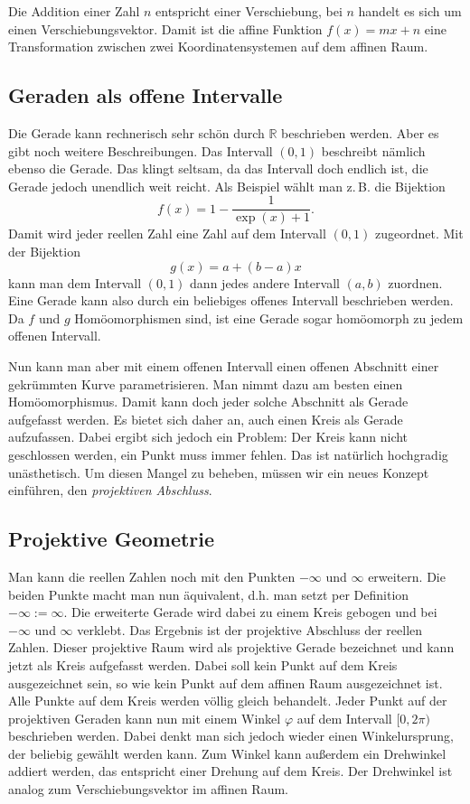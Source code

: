 \documentclass[a4paper,11pt,fleqn,twocolumn,twoside,dvipdfmx]{scrartcl}
\newcommand{\R}{\mathbb R}
\begin{document}
Die Addition einer Zahl $n$ entspricht einer Verschiebung,
bei $n$ handelt es sich um einen Verschiebungsvektor. Damit ist
die affine Funktion $f(x)=mx+n$ eine Transformation zwischen zwei
Koordinatensystemen auf dem affinen Raum.

\subsection{Geraden als offene Intervalle}
Die Gerade kann rechnerisch sehr schön durch $\R$ beschrieben
werden. Aber es gibt noch weitere Beschreibungen. Das Intervall
$(0,1)$ beschreibt nämlich ebenso die Gerade. Das klingt seltsam,
da das Intervall doch endlich ist, die Gerade jedoch unendlich weit
reicht. Als Beispiel wählt man z.\,B. die Bijektion
\begin{equation}
f(x) = 1-\frac{1}{\exp(x)+1}.
\end{equation}
Damit wird jeder reellen Zahl eine Zahl auf dem Intervall $(0,1)$
zugeordnet. Mit der Bijektion
\begin{equation}
g(x) = a+(b-a)x
\end{equation}
kann man dem Intervall $(0,1)$ dann jedes andere Intervall
$(a,b)$ zuordnen. Eine Gerade kann also durch ein beliebiges offenes
Intervall beschrieben werden. Da $f$ und $g$ Homöomorphismen sind,
ist eine Gerade sogar homöomorph zu jedem offenen Intervall.

Nun kann man aber mit einem offenen Intervall einen offenen Abschnitt
einer gekrümmten Kurve parametrisieren. Man nimmt dazu am besten
einen Homöomorphismus. Damit kann doch jeder solche Abschnitt als
Gerade aufgefasst werden. Es bietet sich daher an, auch einen Kreis
als Gerade aufzufassen. Dabei ergibt sich jedoch ein Problem: Der
Kreis kann nicht geschlossen werden, ein Punkt muss immer fehlen.
Das ist natürlich hochgradig unästhetisch. Um diesen Mangel zu
beheben, müssen wir ein neues Konzept einführen, den
\emph{projektiven Abschluss}.

\subsection{Projektive Geometrie}

Man kann die reellen Zahlen noch mit den Punkten $-\infty$
und $\infty$ erweitern. Die beiden Punkte macht man nun äquivalent,
d.h. man setzt per Definition $-\infty:=\infty$. Die erweiterte
Gerade wird dabei zu einem Kreis gebogen und bei $-\infty$ und
$\infty$ verklebt. Das Ergebnis ist der projektive Abschluss der
reellen Zahlen. Dieser projektive Raum wird als projektive Gerade
bezeichnet und kann jetzt als Kreis aufgefasst werden. Dabei soll
kein Punkt auf dem Kreis ausgezeichnet sein, so wie kein Punkt auf
dem affinen Raum ausgezeichnet ist. Alle Punkte auf dem Kreis werden
völlig gleich behandelt. Jeder Punkt auf der projektiven Geraden kann
nun mit einem Winkel $\varphi$ auf dem Intervall $[0,2\pi)$
beschrieben werden. Dabei denkt man sich jedoch wieder einen
Winkelursprung, der beliebig gewählt werden kann. Zum Winkel kann
außerdem ein Drehwinkel addiert werden, das entspricht einer Drehung
auf dem Kreis. Der Drehwinkel ist analog zum Verschiebungsvektor im
affinen Raum.
\end{document}
